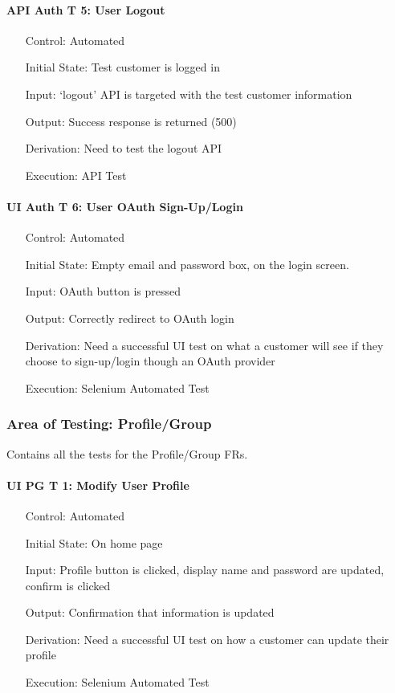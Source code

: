 \documentclass[12pt, titlepage]{article}
\begin{document}
\paragraph*{API Auth T 5: User Logout}
\begin{itemize}
	\item[Control:] Automated
	\item[Initial State:] Test customer is logged in
	\item[Input:] `logout' API is targeted with the test customer information
	\item[Output:] Success response is returned (500)
	\item[Derivation:] Need to test the logout API
	\item[Execution:] API Test
\end{itemize}

\paragraph*{UI Auth T 6: User OAuth Sign-Up/Login}
\begin{itemize}
	\item[Control:] Automated
	\item[Initial State:] Empty email and password box, on the login screen.
	\item[Input:] OAuth button is pressed
	\item[Output:] Correctly redirect to OAuth login
	\item[Derivation:] Need a successful UI test on what a customer will see if they choose to sign-up/login though an OAuth provider
	\item[Execution:] Selenium Automated Test
\end{itemize}

\subsubsection{Area of Testing: Profile/Group}
Contains all the tests for the Profile/Group FRs.

\paragraph*{UI PG T 1: Modify User Profile}
\begin{itemize}
	\item[Control:] Automated
	\item[Initial State:] On home page
	\item[Input:] Profile button is clicked, display name and password are updated, confirm is clicked
	\item[Output:] Confirmation that information is updated
	\item[Derivation:] Need a successful UI test on how a customer can update their profile
	\item[Execution:] Selenium Automated Test
\end{itemize}
\end{document}
